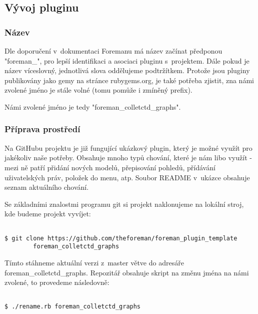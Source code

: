 








\subsection{Vývoj pluginu}


\subsubsection{Název}
Dle doporučení v~dokumentaci Foremanu má název začínat předponou "foreman\_", pro lepší identifikaci a asociaci pluginu s~projektem. Dále pokud je název víceslovný, jednotlivá slova oddělujeme podtržítkem. Protože jsou pluginy publikovány jako gemy na stránce rubygems.org, je také potřeba zjistit, zna námi zvolené jméno je stále volné (tomu pomůže i zmíněný prefix).

Námi zvolené jméno je tedy "foreman\_colletctd\_graphs".

\subsubsection{Příprava prostředí}

Na GitHubu projektu je již fungující ukázkový plugin, který je možné využít pro jakékoliv naše potřeby. Obsahuje mnoho typů chování, které je nám libo využít - mezi ně patří přidání nových modelů, přepisování pohledů, přídávání uživatelských práv, položek do menu, atp. Soubor README v~ukázce obsahuje seznam aktuálního chování.

Se základními znalostmi programu git si projekt naklonujeme na lokální stroj, kde budeme projekt vyvíjet:
\begin{verbatim}

$ git clone https://github.com/theforeman/foreman_plugin_template
 		foreman_colletctd_graphs
\end{verbatim}

Tímto stáhneme aktuální verzi z~master větve do adresáře foreman\_colletctd\_graphs. Repozitář obsahuje skript na změnu jména na námi zvolené, to provedeme následovně:
\begin{verbatim}

$ ./rename.rb foreman_colletctd_graphs
\end{verbatim}




